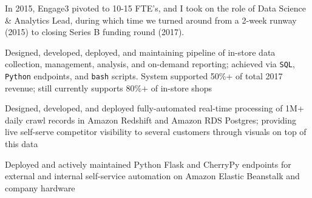 \documentclass[]{deedy-resume-openfont}
\begin{document}
In 2015, Engage3 pivoted to 10-15 FTE's, and I took on the role of Data Science \& Analytics Lead, during which time we turned around from a 2-week runway (2015) to closing Series B funding round (2017).
\begin{tightemize}
\item Designed, developed, deployed, and maintaining pipeline of in-store data collection, management, analysis, and on-demand reporting; achieved via \verb|SQL|, \verb|Python| endpoints, and \verb|bash| scripts.  System supported 50\%+ of total 2017 revenue; still currently supports 80\%+ of in-store shops
\item Designed, developed, and deployed fully-automated real-time processing of 1M+ daily crawl records in Amazon Redshift and Amazon RDS Postgres; providing live self-serve competitor visibility to several customers through visuals on top of this data
\item Deployed and actively maintained Python Flask and CherryPy endpoints for external and internal self-service automation on Amazon Elastic Beanstalk and company hardware
\end{tightemize}



\sectionsep



\end{document}
